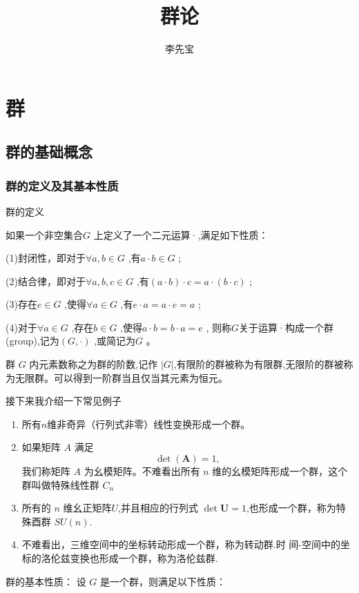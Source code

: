 \documentclass[12pt, openany]{ctexbook} %
\title{群论} %
\author{李先宝} %
\date{} %
\numberwithin{equation}{section} %
\begin{document}
\maketitle %
\chapter{群}
\section{群的基础概念}
\subsection{群的定义及其基本性质}
\begin{mydef}{群的定义}

    如果一个非空集合$G$ 上定义了一个二元运算·,满足如下性质：

    (1)封闭性，即对于$\forall a,b\in G$ ,有$a\cdot b\in G$ ;

    (2)结合律，即对于$\forall a,b,c\in G$ ,有$(a\cdot b)\cdot c=a\cdot(b\cdot c)$ ;

    (3)存在$e\in G$ ,使得$\forall a\in G$ ,有$e\cdot a=a\cdot e=a$ ; 
    
    (4)对于$\forall a\in G$ ,存在$b\in G$ ,使得$a\cdot b=b\cdot a=e$ , 则称$G$关于运算·构成一个群 (group),记为$(G,\cdot)$ ,或简记为$G$ 。
\end{mydef}
群 $G$ 内元素数称之为群的阶数,记作 $|G|$,有限阶的群被称为有限群,无限阶的群被称为无限群。可以得到一阶群当且仅当其元素为恒元。

接下来我介绍一下常见例子
\begin{enumerate}
    \item 所有$n维$非奇异（行列式非零）线性变换形成一个群。
    \item 如果矩阵 $A$ 满足
    \[
    \det(\mathbf{A}) = 1,
    \]
    我们称矩阵 $A$ 为幺模矩阵。不难看出所有 $n$ 维的幺模矩阵形成一个群，这个
    群叫做特殊线性群 $C_n$
    \item 所有的 $n$ 维幺正矩阵$U$,并且相应的行列式
    $\det\boldsymbol{U}=1$,也形成一个群，称为特殊酉群 $SU(n).$
    \item 不难看出，三维空间中的坐标转动形成一个群，称为转动群.时
    间-空间中的坐标的洛伦兹变换也形成一个群，称为洛伦兹群.
\end{enumerate}

群的基本性质：
设 $ G $ 是一个群，则满足以下性质：
\end{document}
